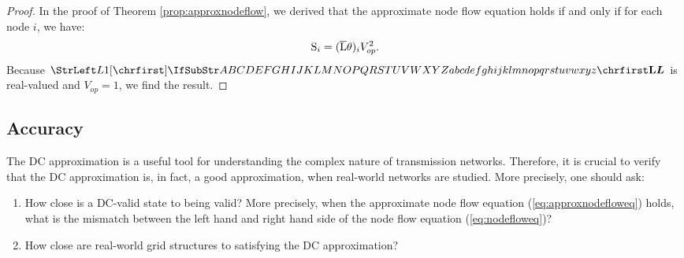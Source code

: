 \documentclass[main.tex]{subfiles}
\begin{document}
\begin{proof}
In the proof of Theorem \ref{prop:approxnodeflow}, we derived that the approximate node flow equation holds if and only if for each node $i$, we have:
\begin{align*}
    {\mathrm{S}}_i = (\overline{{\mathrm{L}}}{\mathrm{\theta}})_i V^2_{op}.
\end{align*}
Because $\mat{L}$ is real-valued and $V_{op}=1$, we find the result.
\end{proof}


\subsection{Accuracy}
The DC approximation is a useful tool for understanding the complex nature of transmission networks. Therefore, it is crucial to verify that the DC approximation is, in fact, a good approximation, when real-world networks are studied. More precisely, one should ask:
\begin{enumerate}
    \item How close is a DC-valid state to being valid? More precisely, when the approximate node flow equation (\ref{eq:approxnodefloweq}) holds, what is the mismatch between the left hand and right hand side of the node flow equation (\ref{eq:nodefloweq})?
    \item How close are real-world grid structures to satisfying the DC approximation?
\end{enumerate}
\end{document}
